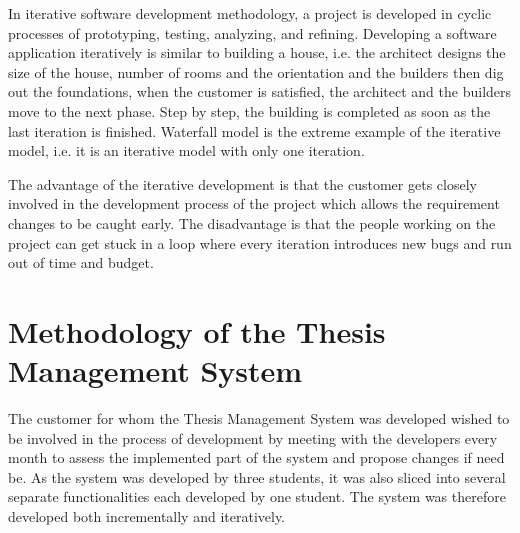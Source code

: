 In iterative software development methodology, a project is developed in cyclic processes of prototyping, testing, analyzing, and refining. Developing a software application iteratively is similar to building a house, i.e. the architect designs the size of the house, number of rooms and the orientation and the builders then dig out the foundations, when the customer is satisfied, the architect and the builders move to the next phase. Step by step, the building is completed as soon as the last iteration is finished. Waterfall model is the extreme example of the iterative model, i.e. it is an iterative model with only one iteration.

The advantage of the iterative development is that the customer gets closely involved in the development process of the project which allows the requirement changes to be caught early. The disadvantage is that the people working on the project can get stuck in a loop where every iteration introduces new bugs and run out of time and budget.

\section{Methodology of the Thesis Management System}

The customer for whom the Thesis Management System was developed wished to be involved in the process of development by meeting with the developers every month to assess the implemented part of the system and propose changes if need be. As the system was developed by three students, it was also sliced into several separate functionalities each developed by one student. The system was therefore developed both incrementally and iteratively.